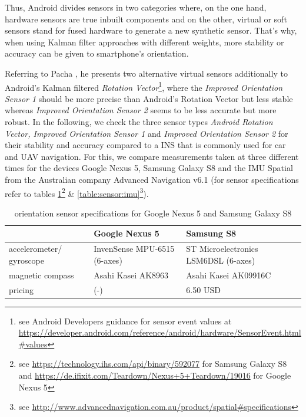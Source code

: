 \documentclass[review]{elsarticle}
\begin{document}
Thus, Android divides sensors in two categories where, on the one hand, hardware sensors are true inbuilt components and on the other, virtual or soft sensors stand for fused hardware to generate a new synthetic sensor. That's why, when using Kalman filter approaches with different weights, more stability or accuracy can be given to smartphone's orientation. 

Referring to Pacha \cite{Pacha2015}, he presents two alternative virtual sensors additionally to Android's Kalman filtered \textit{Rotation Vector}\footnote{see Android Developers guidance for sensor event values at \url{https://developer.android.com/reference/android/hardware/SensorEvent.html\#values}}, where the \textit{Improved Orientation Sensor 1} should be more precise than Android's Rotation Vector but less stable whereas \textit{Improved Orientation Sensor 2} seems to be less accurate but more robust. In the following, we check the three sensor types \textit{Android Rotation Vector, Improved Orientation Sensor 1} and \textit{Improved Orientation Sensor 2} for their stability and accuracy compared to a \gls{INS} that is commonly used for car and \gls{UAV} navigation. For this, we compare measurements taken at three different times for the devices Google Nexus 5, Samsung Galaxy S8 and the \gls{IMU} Spatial from the Australian company Advanced Navigation v6.1 (for sensor specifications refer to tables \ref{table:sensor:specs}\footnote{see \url{https://technology.ihs.com/api/binary/592077} for Samsung Galaxy S8 and \url{https://de.ifixit.com/Teardown/Nexus+5+Teardown/19016} for Google Nexus 5} \& \ref{table:sensor:imu}\footnote{see \url{http://www.advancednavigation.com.au/product/spatial\#specifications}}). 

\begin{center}
\begin{small}
\begin{longtable}[HT]{| p{2.5cm} | p{3cm} | p{4cm} |}
	\caption{orientation sensor specifications for Google Nexus 5 and Samsung Galaxy S8}
	\label{table:sensor:specs}
	\endhead
		\hline
		 & Google Nexus 5 & Samsung S8 \\ \hline
		accelerometer/ gyroscope & InvenSense MPU-6515 (6-axes) & {ST Microelectronics} LSM6DSL (6-axes) \\ \hline
		magnetic compass & Asahi Kasei AK8963 & Asahi Kasei AK09916C \\ \hline
		pricing & (-) & 6.50 USD                                                                           \\ \hline
\end{longtable}
\end{small}
\end{center}
\end{document}
